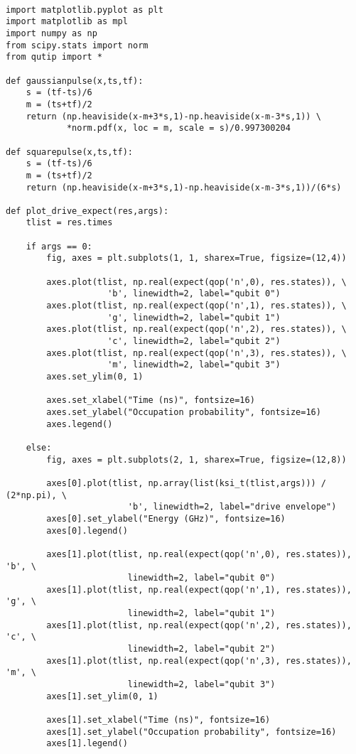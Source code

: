 \begin{verbatim}

import matplotlib.pyplot as plt
import matplotlib as mpl
import numpy as np
from scipy.stats import norm
from qutip import *

def gaussianpulse(x,ts,tf):
    s = (tf-ts)/6
    m = (ts+tf)/2
    return (np.heaviside(x-m+3*s,1)-np.heaviside(x-m-3*s,1)) \
            *norm.pdf(x, loc = m, scale = s)/0.997300204

def squarepulse(x,ts,tf):
    s = (tf-ts)/6
    m = (ts+tf)/2
    return (np.heaviside(x-m+3*s,1)-np.heaviside(x-m-3*s,1))/(6*s)

def plot_drive_expect(res,args):
    tlist = res.times

    if args == 0:
        fig, axes = plt.subplots(1, 1, sharex=True, figsize=(12,4))

        axes.plot(tlist, np.real(expect(qop('n',0), res.states)), \
                    'b', linewidth=2, label="qubit 0")
        axes.plot(tlist, np.real(expect(qop('n',1), res.states)), \
                    'g', linewidth=2, label="qubit 1")
        axes.plot(tlist, np.real(expect(qop('n',2), res.states)), \
                    'c', linewidth=2, label="qubit 2")
        axes.plot(tlist, np.real(expect(qop('n',3), res.states)), \
                    'm', linewidth=2, label="qubit 3")
        axes.set_ylim(0, 1)

        axes.set_xlabel("Time (ns)", fontsize=16)
        axes.set_ylabel("Occupation probability", fontsize=16)
        axes.legend()

    else:
        fig, axes = plt.subplots(2, 1, sharex=True, figsize=(12,8))

        axes[0].plot(tlist, np.array(list(ksi_t(tlist,args))) / (2*np.pi), \
                        'b', linewidth=2, label="drive envelope")
        axes[0].set_ylabel("Energy (GHz)", fontsize=16)
        axes[0].legend()

        axes[1].plot(tlist, np.real(expect(qop('n',0), res.states)), 'b', \
                        linewidth=2, label="qubit 0")
        axes[1].plot(tlist, np.real(expect(qop('n',1), res.states)), 'g', \
                        linewidth=2, label="qubit 1")
        axes[1].plot(tlist, np.real(expect(qop('n',2), res.states)), 'c', \
                        linewidth=2, label="qubit 2")
        axes[1].plot(tlist, np.real(expect(qop('n',3), res.states)), 'm', \
                        linewidth=2, label="qubit 3")
        axes[1].set_ylim(0, 1)

        axes[1].set_xlabel("Time (ns)", fontsize=16)
        axes[1].set_ylabel("Occupation probability", fontsize=16)
        axes[1].legend()


\end{verbatim}
